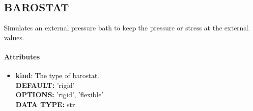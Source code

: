 \subsection{BAROSTAT}
\label{BAROSTAT}
Simulates an external pressure bath to keep the pressure or stress at the external values.
\paragraph{Attributes}
 \begin{itemize}
\item {\bf kind}:
 The type of barostat.
{\\ \bf DEFAULT: }'rigid'
{\\ \bf OPTIONS: }'rigid', 'flexible'
{\\ \bf DATA TYPE: }str
\end{itemize}
 
